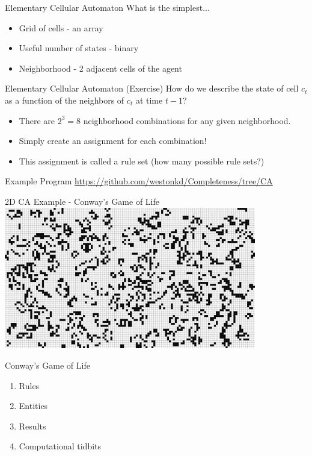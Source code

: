 \documentclass[bigger]{beamer}
\begin{document}
\begin{frame}[label=sec-10]{Elementary Cellular Automaton}
What is the simplest...
\begin{itemize}
\item<1->Grid of cells - an array
\item<1->Useful number of states - binary
\item<1->Neighborhood - 2 adjacent cells of the agent
\end{itemize}
\end{frame}

\begin{frame}[label=sec-11]{Elementary Cellular Automaton (Exercise)}
How do we describe the state of cell \(c_t\) as a function of the neighbors of \(c_t\) at time \(t-1\)?
\begin{itemize}
\item<2->There are \(2^3 = 8\) neighborhood combinations for any given neighborhood.
\item<3->Simply create an assignment for each combination!
\item<4->This assignment is called a rule set (how many possible rule sets?)
\end{itemize}
\end{frame}

\begin{frame}[label=sec-12]{Example Program}
\url{https://github.com/westonkd/Completeness/tree/CA}
\end{frame}

\begin{frame}[label=sec-13]{2D CA Example - Conway's Game of Life}
\includegraphics[width=11cm]{images/gol1.jpg}
\end{frame}

\begin{frame}[label=sec-14]{Conway's Game of Life}
\begin{enumerate}
\item<1->Rules
\item<2->Entities
\item<3->Results
\item<4->Computational tidbits
\end{enumerate}
\end{frame}
\end{document}

